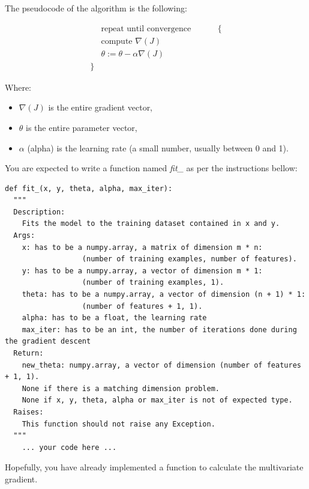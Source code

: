\documentclass{42-en}
\begin{document}
The pseudocode of the algorithm is the following:

$$
\begin{matrix}
    &   \text{repeat until convergence} \hspace{1cm} &  \{  \\
    &   \text{compute } \nabla{(J)}  \\
    &	\theta := \theta - \alpha \nabla(J)                 \\ 
\} 
\end{matrix}
$$

Where:
\begin{itemize}
  \item $\nabla{(J)}$ is the entire gradient vector,
  \item $\theta$ is the entire parameter vector,
  \item $\alpha$ (alpha) is the learning rate (a small number, usually between 0 and 1).
\end{itemize}


You are expected to write a function named \textit{fit\_} as per the instructions bellow:

\begin{verbatim}
def fit_(x, y, theta, alpha, max_iter):
  """
  Description:
    Fits the model to the training dataset contained in x and y.
  Args:
    x: has to be a numpy.array, a matrix of dimension m * n:
                  (number of training examples, number of features).
    y: has to be a numpy.array, a vector of dimension m * 1:
                  (number of training examples, 1).
    theta: has to be a numpy.array, a vector of dimension (n + 1) * 1:
                  (number of features + 1, 1).
    alpha: has to be a float, the learning rate
    max_iter: has to be an int, the number of iterations done during the gradient descent
  Return:
    new_theta: numpy.array, a vector of dimension (number of features + 1, 1).
    None if there is a matching dimension problem.
    None if x, y, theta, alpha or max_iter is not of expected type.
  Raises:
    This function should not raise any Exception.
  """
    ... your code here ...
\end{verbatim}

Hopefully, you have already implemented a function to calculate the multivariate gradient.

\end{document}
